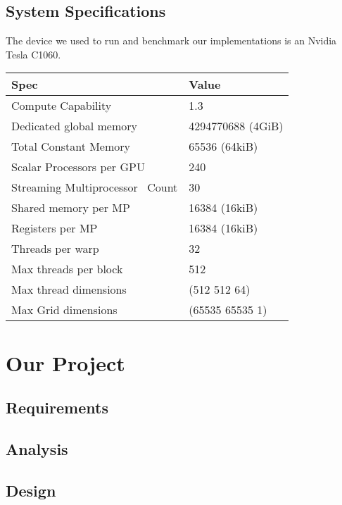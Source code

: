 \documentclass[10pt]{article}
\begin{document}
\begin{multicols}{2}
    \subsection{System Specifications}
    The device we used to run and benchmark our implementations is an Nvidia Tesla C1060.

    \begin{table*} \centering
    \begin{tabular}{@{}l l@{}}\toprule
    Spec                            &   Value               \\
    \hline
    Compute Capability              &   1.3                 \\
    Dedicated global memory         &   4294770688 (4GiB)   \\
    Total Constant Memory           &   65536 (64kiB)       \\
    Scalar Processors per GPU       &   240                 \\
    Streaming Multiprocessor \
    Count                           &   30                  \\
    Shared memory per MP            &   16384 (16kiB)       \\
    Registers per MP                &   16384 (16kiB)       \\
    Threads per warp                &   32                  \\
    Max threads per block           &   512                 \\
    Max thread dimensions           &   (512 512 64)        \\
    Max Grid dimensions             &   (65535 65535 1)     \\
    \hline
    \end{tabular}
    \end{table*}

\section{Our Project}
    \subsection{Requirements} %
    \subsection{Analysis} %
    \subsection{Design} %


\end{multicols}
\end{document}
